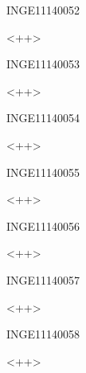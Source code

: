 \documentclass{article}
\begin{document}
\begin{corrige}{INGE11140052}

<++>

\end{corrige}%


\begin{corrige}{INGE11140053}

<++>

\end{corrige}%


\begin{corrige}{INGE11140054}

<++>

\end{corrige}%


\begin{corrige}{INGE11140055}

<++>

\end{corrige}%


\begin{corrige}{INGE11140056}

<++>

\end{corrige}%


\begin{corrige}{INGE11140057}

<++>

\end{corrige}%


\begin{corrige}{INGE11140058}

<++>

\end{corrige}%
\end{document}
